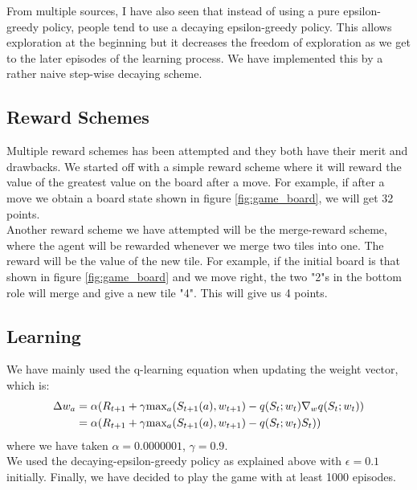 From multiple sources, I have also seen that instead of using a pure epsilon-greedy policy, people tend to use a decaying epsilon-greedy policy. This allows exploration at the beginning but it decreases the freedom of exploration as we get to the later episodes of the learning process. We have implemented this by a rather naive step-wise decaying scheme.  

\subsection{Reward Schemes}
Multiple reward schemes has been attempted and they both have their merit and drawbacks. We started off with a simple reward scheme where it will reward the value of the greatest value on the board after a move. For example, if after a move we obtain a board state shown in figure \ref{fig:game_board}, we will get 32 points. 
\\

Another reward scheme we have attempted will be the merge-reward scheme, where the agent will be rewarded whenever we merge two tiles into one. The reward will be the value of the new tile. For example, if the initial board is that shown in figure \ref{fig:game_board} and we move right, the two "2"s in the bottom role will merge and give a new tile "4". This will give us 4 points.

\subsection{Learning}
We have mainly used the q-learning equation when updating the weight vector, which is:
\begin{align}
\Delta w_a
& = \alpha(R_{t+1} + \gamma \mbox{max}_{a}(S_{t+1} (a), w_{t+1}) - q(S_{t}; w_{t})  \nabla_{w} q(S_{t}; w_{t}))
\\ %
& =  \alpha(R_{t+1} + \gamma \mbox{max}_{a}(S_{t+1} (a), w_{t+1}) - q(S_{t}; w_{t})  S_{t}))
\notag %
\end{align}
where we have taken $\alpha = 0.0000001$, $\gamma = 0.9$. 
\\

We used the decaying-epsilon-greedy policy as explained above with $\epsilon=0.1$ initially. Finally, we have decided to play the game with at least 1000 episodes.


